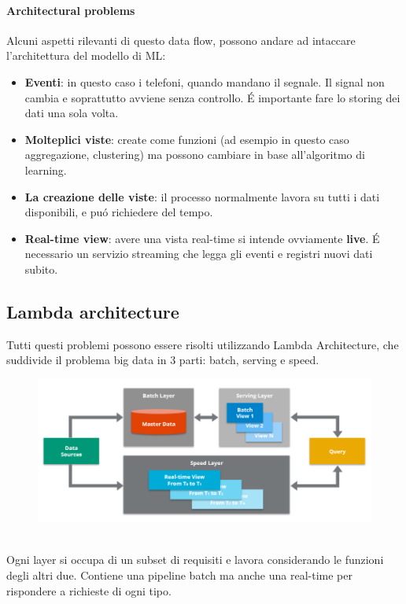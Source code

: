 \newpage

\paragraph{Architectural problems} Alcuni aspetti rilevanti di questo data flow, possono andare ad intaccare l'architettura del modello di ML:
\begin{itemize}
    \item \textbf{Eventi}: in questo caso i telefoni, quando mandano il segnale. Il signal non cambia e soprattutto avviene senza controllo. É importante fare lo storing dei dati una sola volta. 
    \item \textbf{Molteplici viste}: create come funzioni (ad esempio in questo caso aggregazione, clustering) ma possono cambiare in base all'algoritmo di learning. 
    \item \textbf{La creazione delle viste}: il processo normalmente lavora su tutti i dati disponibili, e puó richiedere del tempo. 
    \item \textbf{Real-time view}: avere una vista real-time si intende ovviamente \textbf{live}. É necessario un servizio streaming che legga gli eventi e registri nuovi dati subito.
\end{itemize}

\subsection{Lambda architecture}
Tutti questi problemi possono essere risolti utilizzando Lambda Architecture, che suddivide il problema big data in 3 parti: batch, serving e speed. 
\\
\begin{figure}[th]
    \centering
    \includegraphics[width=0.6\linewidth]{GraphDataEngineering//img/lambdaarch.png}
\end{figure}
\\
Ogni layer si occupa di un subset di requisiti e lavora considerando le funzioni degli altri due. Contiene una pipeline batch ma anche una real-time per rispondere a richieste di ogni tipo. 
